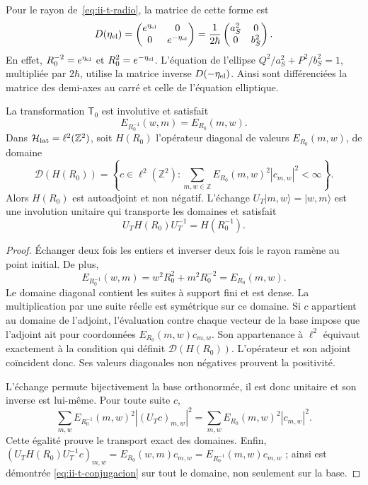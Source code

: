 Pour le rayon de~\eqref{eq:ii-t-radio}, la matrice de cette forme est
\begin{equation}
 D(\eta_{\rm el})=
 \begin{pmatrix}e^{\eta_{\rm el}}&0\\0&e^{-\eta_{\rm el}}\end{pmatrix}
 =\frac{1}{2\hbar}
 \begin{pmatrix}a_S^2&0\\0&b_S^2\end{pmatrix}.
 \label{eq:ii-t-matriz}
\end{equation}
En effet, \(R_0^{-2}=e^{\eta_{\rm el}}\) et
\(R_0^2=e^{-\eta_{\rm el}}\). L’équation de l’ellipse
\(Q^2/a_S^2+P^2/b_S^2=1\), multipliée par \(2\hbar\), utilise
la matrice inverse \(D(-\eta_{\rm el})\). Ainsi sont différenciées
la matrice des demi-axes au carré et celle de l’équation elliptique.

\begin{theorem}
\label{thm:ii-t-unitaria}
La transformation \(\mathsf T_0\) est involutive et satisfait
\begin{equation}
 E_{R_0^{-1}}(w,m)=E_{R_0}(m,w).
 \label{eq:ii-t-invariancia}
\end{equation}
Dans \(\mathcal H_{\rm lat}=\ell^2(\mathbb Z^2)\), soit \(H(R_0)\)
l’opérateur diagonal de valeurs \(E_{R_0}(m,w)\), de domaine
\[
 \mathcal D(H(R_0))=
 \left\{c\in\ell^2(\mathbb Z^2):
 \sum_{m,w\in\mathbb Z}E_{R_0}(m,w)^2|c_{m,w}|^2<\infty\right\}.
\]
Alors \(H(R_0)\) est autoadjoint et non négatif. L’échange
\(U_T|m,w\rangle=|w,m\rangle\) est une involution unitaire qui
transporte les domaines et satisfait
\begin{equation}
 U_T H(R_0)U_T^{-1}=H(R_0^{-1}).
 \label{eq:ii-t-conjugacion}
\end{equation}
\end{theorem}

\begin{proof}
Échanger deux fois les entiers et inverser deux fois le rayon ramène
au point initial. De plus,
\[
 E_{R_0^{-1}}(w,m)=w^2R_0^2+m^2R_0^{-2}=E_{R_0}(m,w).
\]
Le domaine diagonal contient les suites à support fini et est dense.
La multiplication par une suite réelle est symétrique sur ce domaine.
Si \(c\) appartient au domaine de l’adjoint, l’évaluation contre chaque
vecteur de la base impose que l’adjoint ait pour coordonnées
\(E_{R_0}(m,w)c_{m,w}\). Son appartenance à \(\ell^2\) équivaut
exactement à la condition qui définit \(\mathcal D(H(R_0))\).
L’opérateur et son adjoint coïncident donc. Ses valeurs diagonales non
négatives prouvent la positivité.

L’échange permute bijectivement la base orthonormée, il est donc
unitaire et son inverse est lui-même. Pour toute suite \(c\),
\[
 \sum_{m,w}E_{R_0^{-1}}(m,w)^2|(U_Tc)_{m,w}|^2
 =\sum_{m,w}E_{R_0}(m,w)^2|c_{m,w}|^2.
\]
Cette égalité prouve le transport exact des domaines. Enfin,
\((U_TH(R_0)U_T^{-1}c)_{m,w}=E_{R_0}(w,m)c_{m,w}
=E_{R_0^{-1}}(m,w)c_{m,w}\) ; ainsi est démontrée
\eqref{eq:ii-t-conjugacion} sur tout le domaine, non seulement sur la base.
\end{proof}

